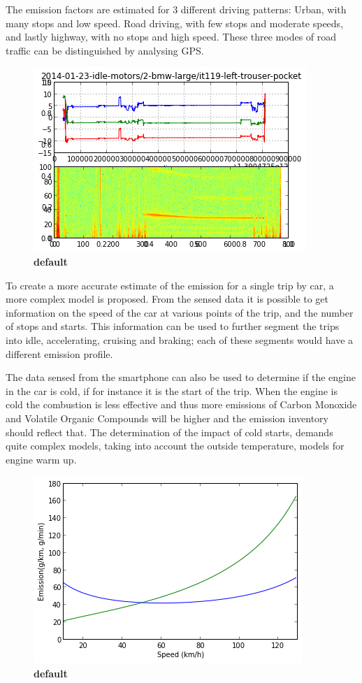 The emission factors are estimated for 3 different driving patterns: Urban, with many stops and low speed. Road driving, with few stops and moderate speeds, and lastly highway, with no stops and high speed. These three modes of road traffic can be distinguished by analysing GPS.  
\begin{figure}[!ht]
\begin{center}
\includegraphics{idle_BMW.png}
\caption{{\bf default}}
\label{idle_bmw}
\end{center}
\end{figure}

To create a more accurate estimate of the emission for a single trip by car, a more complex model is proposed. From the sensed data it is possible to get information on the speed of the car at various points of the trip, and the number of stops and starts. This information can be used to further segment the trips into idle, accelerating, cruising and braking; each of these segments would have a different emission profile. 

The data sensed from the smartphone can also be used to determine if the engine in the car is cold, if for instance it is the start of the trip. When the engine is cold the combustion is less effective and thus more emissions of Carbon Monoxide and Volatile Organic Compounds will be higher and the emission inventory should reflect that. The determination of the impact of cold starts, demands quite complex models, taking into account the outside temperature, models for engine warm up. 
\begin{figure}[htbp]
\begin{center}
\includegraphics{emission_vs_speed.png}
\caption{{\bf default}}
\label{emission_vs_speed}
\end{center}
\end{figure}


